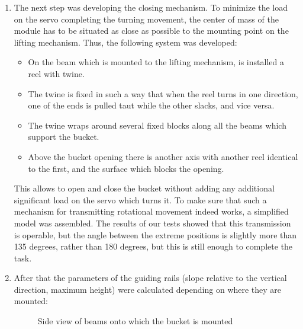 \begin{enumerate}
  \item The next step was developing the closing mechanism. To minimize the load on the servo completing the turning movement, the center of mass of the module has to be situated as close as possible to the mounting point on the lifting mechanism. Thus, the following system was developed:
    \begin{itemize}
      \item On the beam which is mounted to the lifting mechanism, is installed a reel with twine.
      \item The twine is fixed in such a way that when the reel turns in one direction, one of the ends is pulled taut while the other  slacks, and vice versa.
      \item The twine wraps around several fixed blocks along all the beams which support the bucket.
      \item Above the bucket opening there is another axis with another reel identical to the first, and the surface which blocks the opening.
    \end{itemize} 
  This allows to open and close the bucket without adding any additional significant load on the servo which turns it. To make sure that such a mechanism for transmitting rotational movement indeed works, a simplified model was assembled. The results of our tests showed that this transmission is operable, but the angle between the extreme positions is slightly more than 135 degrees, rather than 180 degrees, but this is still enough to complete the task. 
  \item After that the parameters of the guiding rails (slope relative to the vertical direction, maximum height) were calculated depending on where they are mounted: 
  \begin{figure}[h]
  	\begin{minipage}[h]{1\linewidth}
   	    \caption{Side view of beams onto which the bucket is mounted}
   	\end{minipage}
  \end{figure}	
  

\end{enumerate}
